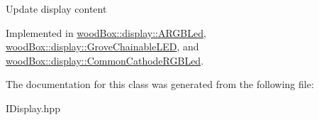 Update display content 

Implemented in \mbox{\hyperlink{classwood_box_1_1display_1_1_a_r_g_b_led_ab71f321d91e931f95b96d1f492a9454d}{wood\+Box\+::display\+::\+A\+R\+G\+B\+Led}}, \mbox{\hyperlink{classwood_box_1_1display_1_1_grove_chainable_l_e_d_a650969665d0b5607465a63159c62e4ef}{wood\+Box\+::display\+::\+Grove\+Chainable\+L\+ED}}, and \mbox{\hyperlink{classwood_box_1_1display_1_1_common_cathode_r_g_b_led_a597c7ae002c7f94431ccaafd160a857a}{wood\+Box\+::display\+::\+Common\+Cathode\+R\+G\+B\+Led}}.



The documentation for this class was generated from the following file\+:\begin{DoxyCompactItemize}
\item 
I\+Display.\+hpp\end{DoxyCompactItemize}
